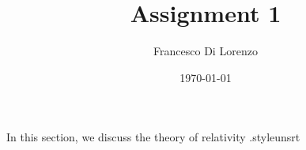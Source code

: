 \documentclass[a4paper,12pt]{article}
\title{Assignment 1}	                                    %
\author{Francesco Di Lorenzo}                       %
\date{\today}									    %
\begin{document}

\newpage

\tableofcontents
\newpage


\clearpage

\clearpage


\newpage

In this section, we discuss the theory of relativity \cite{einstein1905}.style{unsrt}  %
\end{document}

